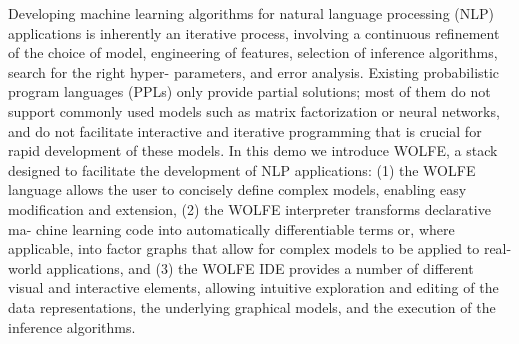 Developing machine learning algorithms for natural language processing (NLP) applications is inherently an iterative process, involving a continuous refinement of the choice of model, engineering of features, selection of inference algorithms, search for the right hyper- parameters, and error analysis. Existing probabilistic program languages (PPLs) only provide partial solutions; most of them do not support commonly used models such as matrix factorization or neural networks, and do not facilitate interactive and iterative programming that is crucial for rapid development of these models. In this demo we introduce WOLFE, a stack designed to facilitate the development of NLP applications: (1) the WOLFE language allows the user to concisely define complex models, enabling easy modification and extension, (2) the WOLFE interpreter transforms declarative ma- chine learning code into automatically differentiable terms or, where applicable, into factor graphs that allow for complex models to be applied to real-world applications, and (3) the WOLFE IDE provides a number of different visual and interactive elements, allowing intuitive exploration and editing of the data representations, the underlying graphical models, and the execution of the inference algorithms.
